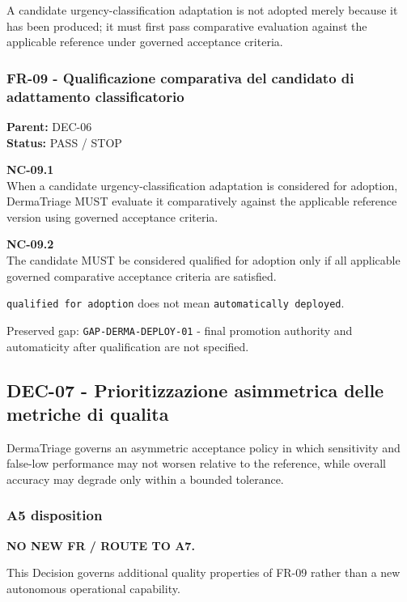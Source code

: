 \documentclass[11pt,a4paper]{article}
\begin{document}
A candidate urgency-classification adaptation is not adopted merely
because it has been produced; it must first pass comparative evaluation
against the applicable reference under governed acceptance criteria.

\subsubsection{FR-09 - Qualificazione comparativa del candidato di
adattamento
classificatorio}\label{fr-09---qualificazione-comparativa-del-candidato-di-adattamento-classificatorio}

\textbf{Parent:} DEC-06\\
\textbf{Status:} PASS / STOP

\textbf{NC-09.1}\\
When a candidate urgency-classification adaptation is considered for
adoption, DermaTriage MUST evaluate it comparatively against the
applicable reference version using governed acceptance criteria.

\textbf{NC-09.2}\\
The candidate MUST be considered qualified for adoption only if all
applicable governed comparative acceptance criteria are satisfied.

\texttt{qualified\ for\ adoption} does not mean
\texttt{automatically\ deployed}.

Preserved gap: \texttt{GAP-DERMA-DEPLOY-01} - final promotion authority
and automaticity after qualification are not specified.

\subsection{DEC-07 - Prioritizzazione asimmetrica delle metriche di
qualita\textquotesingle{}}\label{dec-07---prioritizzazione-asimmetrica-delle-metriche-di-qualita}

DermaTriage governs an asymmetric acceptance policy in which sensitivity
and false-low performance may not worsen relative to the reference,
while overall accuracy may degrade only within a bounded tolerance.

\subsubsection{A5 disposition}\label{a5-disposition}

\textbf{NO NEW FR / ROUTE TO A7.}

This Decision governs additional quality properties of FR-09 rather than
a new autonomous operational capability.
\end{document}
